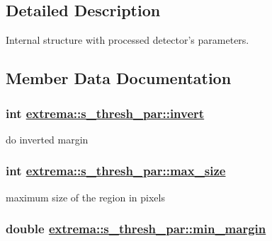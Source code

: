 \subsection{Detailed Description}
Internal structure with processed detector's parameters. 



\subsection{Member Data Documentation}
\hypertarget{structextrema_1_1s__thresh__par_b88feaa4021f723c03c14bad696ee559}{
\subsubsection[invert]{\setlength{\rightskip}{0pt plus 5cm}int \hyperlink{structextrema_1_1s__thresh__par_b88feaa4021f723c03c14bad696ee559}{extrema::s\_\-thresh\_\-par::invert}}}
\label{structextrema_1_1s__thresh__par_b88feaa4021f723c03c14bad696ee559}


do inverted margin 

\hypertarget{structextrema_1_1s__thresh__par_e41c8394cd39342bdc0ad30b2435d2d9}{
\subsubsection[max\_\-size]{\setlength{\rightskip}{0pt plus 5cm}int \hyperlink{structextrema_1_1s__thresh__par_e41c8394cd39342bdc0ad30b2435d2d9}{extrema::s\_\-thresh\_\-par::max\_\-size}}}
\label{structextrema_1_1s__thresh__par_e41c8394cd39342bdc0ad30b2435d2d9}


maximum size of the region in pixels 

\hypertarget{structextrema_1_1s__thresh__par_1fd2229abda53b5b3b70b61f58671347}{
\subsubsection[min\_\-margin]{\setlength{\rightskip}{0pt plus 5cm}double \hyperlink{structextrema_1_1s__thresh__par_1fd2229abda53b5b3b70b61f58671347}{extrema::s\_\-thresh\_\-par::min\_\-margin}}}
\label{structextrema_1_1s__thresh__par_1fd2229abda53b5b3b70b61f58671347}


